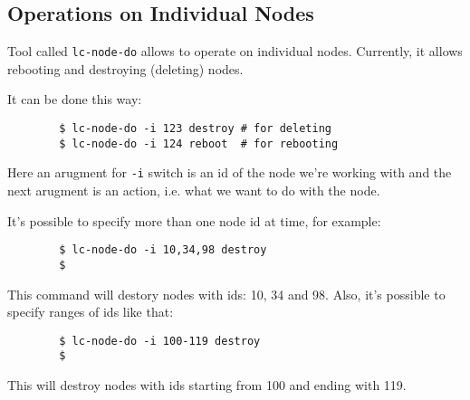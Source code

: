 \documentclass[a4paper]{report}
\begin{document}
       \subsection{Operations on Individual Nodes}
       Tool called \texttt{lc-node-do} allows to operate on individual nodes.
       Currently, it allows rebooting and destroying (deleting) nodes.

       It can be done this way:

       \begin{verbatim}
        $ lc-node-do -i 123 destroy # for deleting
        $ lc-node-do -i 124 reboot  # for rebooting
        \end{verbatim}

       Here an arugment for \texttt{-i} switch is an id of the node we're working
       with and the next arugment is an action, i.e. what we want to do with the node.

       It's possible to specify more than one node id at time, for example:

       \begin{verbatim}
        $ lc-node-do -i 10,34,98 destroy
        $
        \end{verbatim}

       This command will destory nodes with ids: 10, 34 and 98. Also, it's possible to
       specify ranges of ids like that:

       \begin{verbatim}
        $ lc-node-do -i 100-119 destroy
        $
        \end{verbatim}

      This will destroy nodes with ids starting from 100 and ending with 119.
\end{document}
